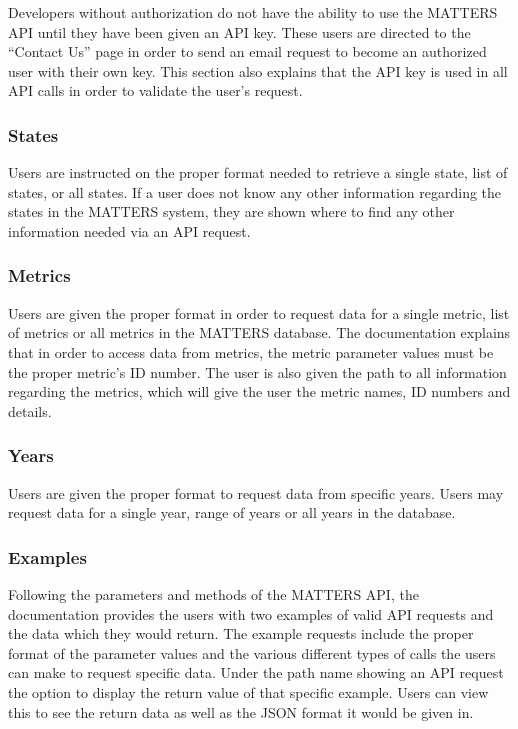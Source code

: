 		Developers without authorization do not have the ability to use the MATTERS API until they have been given an API key. These users are directed to the “Contact Us” page in order to send an email request to become an authorized user with their own key. This section also explains that the API key is used in all API calls in order to validate the user's request.
			
		\subsubsection{States}
			
			Users are instructed on the proper format needed to retrieve a single state, list of states, or all states. If a user does not know any other information regarding the states in the MATTERS system, they are shown where to find any other information needed via an API request.
			
		\subsubsection{Metrics}
			
			Users are given the proper format in order to request data for a single metric, list of metrics or all metrics in the MATTERS database. The documentation explains that in order to access data from metrics, the metric parameter values must be the proper metric’s ID number. The user is also given the path to all information regarding the metrics, which will give the user the metric names, ID numbers and details.
			
		\subsubsection{Years}
			
			Users are given the proper format to request data from specific years. Users may request data for a single year, range of years or all years in the database. 
			
		\subsubsection{Examples}
			
			Following the parameters and methods of the MATTERS API, the documentation provides the users with two examples of valid API requests and the data which they would return. The example requests include the proper format of the parameter values and the various different types of calls the users can make to request specific data. Under the path name showing an API request the option to display the return value of that specific example. Users can view this to see the return data as well as the JSON format it would be given in. 
			



